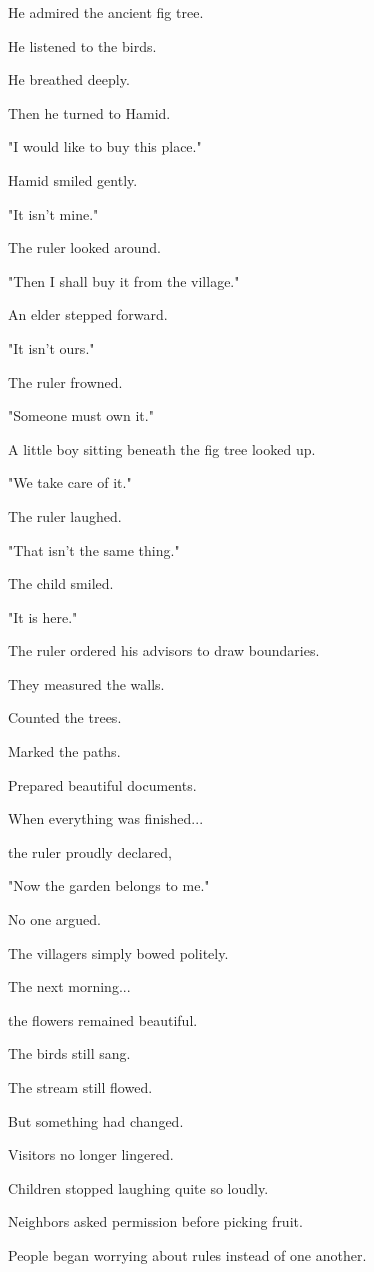 \documentclass[12pt,openany]{book}
\begin{document}
He admired the ancient fig tree.

He listened to the birds.

He breathed deeply.

Then he turned to Hamid.

"I would like to buy this place."

Hamid smiled gently.

"It isn't mine."

The ruler looked around.

"Then I shall buy it from the village."

An elder stepped forward.

"It isn't ours."

The ruler frowned.

"Someone must own it."

A little boy sitting beneath the fig tree looked up.

"We take care of it."

The ruler laughed.

"That isn't the same thing."

The child smiled.

"It is here."

The ruler ordered his advisors to draw boundaries.

They measured the walls.

Counted the trees.

Marked the paths.

Prepared beautiful documents.

When everything was finished...

the ruler proudly declared,

"Now the garden belongs to me."

No one argued.

The villagers simply bowed politely.

The next morning...

the flowers remained beautiful.

The birds still sang.

The stream still flowed.

But something had changed.

Visitors no longer lingered.

Children stopped laughing quite so loudly.

Neighbors asked permission before picking fruit.

People began worrying about rules instead of one another.
\end{document}

